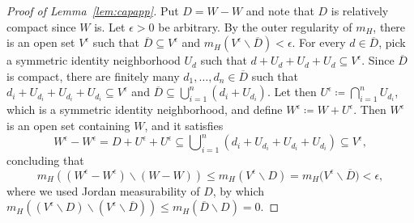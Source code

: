 \documentclass{amsart}
\numberwithin{equation}{subsection}
\theoremstyle{remark}
\begin{document}
\begin{proof}[Proof of Lemma~\ref{lem:capapp}]
Put \(D=W-W\) and note that \(D\) is relatively compact since \(W\) is. Let \(\epsilon>0\) be arbitrary. By the outer regularity of \(m_{H}\), there is an open set \(V^{\epsilon}\) such that \(\overline{D}\subseteq V^{\epsilon}\) and \(m_{H}\left(V^{\epsilon}\backslash\overline{D}\right)<\epsilon\). For every \(d\in\overline{D}\), pick a symmetric identity neighborhood \(U_{d}\) such that \(d+U_{d}+U_{d}+U_{d}\subseteq V^{\epsilon}\). Since \(\overline{D}\) is compact, there are finitely many \(d_{1},\dotsc,d_{n}\in\overline{D}\) such that \(d_{i}+U_{d_{i}}+U_{d_{i}}+U_{d_{i}}\subseteq V^{\epsilon}\) and \(\overline{D}\subseteq\bigcup\nolimits_{i=1}^{n}\left(d_{i}+U_{d_{i}}\right)\). Let then \(U^{\epsilon}\coloneqq\bigcap\nolimits_{i=1}^{n}U_{d_{i}}\), which is a symmetric identity neighborhood, and define \(W^{\epsilon}\coloneqq W+U^{\epsilon}\). Then \(W^{\epsilon}\) is an open set containing \(W\), and it satisfies
\[W^{\epsilon}-W^{\epsilon}=D+U^{\epsilon}+U^{\epsilon}\subseteq\bigcup\nolimits_{i=1}^{n}\left(d_{i}+U_{d_{i}}+U_{d_{i}}+U_{d_{i}}\right)\subseteq V^{\epsilon},\]
concluding that
\[m_{H}\left(\left(W^{\epsilon}-W^{\epsilon}\right)\backslash\left(W-W\right)\right)\leq m_{H}\left(V^{\epsilon}\backslash D\right)=m_{H}\big(V^{\epsilon}\backslash\overline{D}\big)<\epsilon,\]
where we used Jordan measurability of \(D\), by which \(m_{H}\left(\left(V^{\epsilon}\backslash D\right)\backslash\left(V^{\epsilon}\backslash\overline{D}\right)\right)\leq m_{H}\left(\overline{D}\backslash D\right)=0\).
\end{proof}
\end{document}
